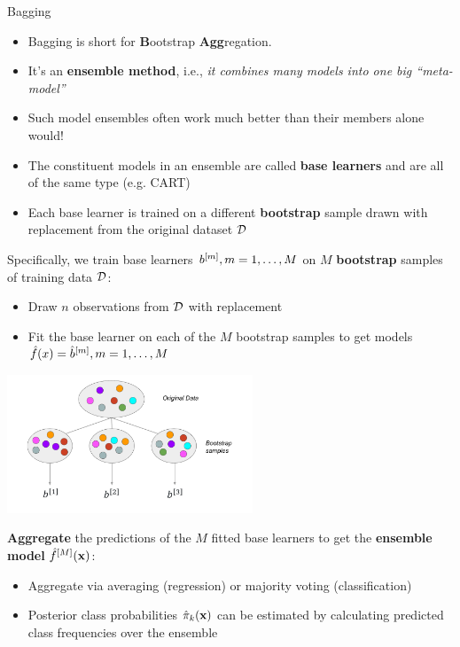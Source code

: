 \documentclass[11pt,compress,t,notes=noshow, xcolor=table]{beamer}
\begin{document}
\begin{vbframe}{Bagging}

\begin{itemize}
  \item Bagging is short for \textbf{B}ootstrap \textbf{Agg}regation.
  \item It's an \textbf{ensemble method}, i.e., \textit{it combines many models into one big \enquote{meta-model}}
  \item Such model ensembles often work much better than their members alone would!
  \item The constituent models in an ensemble are called \textbf{base learners} and are all of the same type (e.g. CART)
  \item Each base learner is trained on a different \textbf{bootstrap} sample drawn with replacement from the original dataset $\mathcal{D}$
\end{itemize}

\framebreak 
Specifically, we train base learners $b^{[m]}, m = 1, \dots, M$ on $M$ \textbf{bootstrap} samples of training data $\mathcal{D}$:
\begin{itemize}
  \item Draw $n$ observations from $\mathcal{D}$ with replacement
  \item Fit the base learner on each of the $M$ bootstrap samples to get models $\hat{f}(x) = \hat{b}^{[m]}, m = 1, \dots, M$
\end{itemize}

\begin{center}
\includegraphics[width=0.55\textwidth]{figure_man/bagging.pdf}
\end{center}

\framebreak

\textbf{Aggregate} the predictions of the $M$ fitted base learners to get the
\textbf{ensemble model} $\hat f^{[M]}(\mathbf{x})$:
  \begin{itemize}
    \item Aggregate via averaging (regression) or majority voting (classification)
    \item Posterior class probabilities $\hat \pi_{k}(\mathbf{x})$ can be estimated by calculating predicted class frequencies over the ensemble
  \end{itemize}


\end{vbframe}
\end{document}
